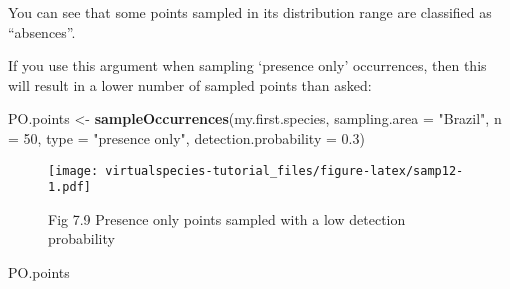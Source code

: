 \documentclass[]{article}
\newenvironment{Shaded}{\begin{snugshade}}{\end{snugshade}}
\newcommand{\KeywordTok}[1]{\textcolor[rgb]{0.13,0.29,0.53}{\textbf{#1}}}
\newcommand{\DataTypeTok}[1]{\textcolor[rgb]{0.13,0.29,0.53}{#1}}
\newcommand{\DecValTok}[1]{\textcolor[rgb]{0.00,0.00,0.81}{#1}}
\newcommand{\FloatTok}[1]{\textcolor[rgb]{0.00,0.00,0.81}{#1}}
\newcommand{\StringTok}[1]{\textcolor[rgb]{0.31,0.60,0.02}{#1}}
\newcommand{\NormalTok}[1]{#1}
\begin{document}
You can see that some points sampled in its distribution range are
classified as ``absences''.

If you use this argument when sampling `presence only' occurrences, then
this will result in a lower number of sampled points than asked:

\begin{Shaded}
\begin{Highlighting}[]
\NormalTok{PO.points <-}\StringTok{ }\KeywordTok{sampleOccurrences}\NormalTok{(my.first.species,}
                               \DataTypeTok{sampling.area =} \StringTok{"Brazil"}\NormalTok{,}
                               \DataTypeTok{n =} \DecValTok{50}\NormalTok{,}
                               \DataTypeTok{type =} \StringTok{"presence only"}\NormalTok{,}
                               \DataTypeTok{detection.probability =} \FloatTok{0.3}\NormalTok{)}
\end{Highlighting}
\end{Shaded}

\begin{figure}
\centering
\texttt{[image: virtualspecies-tutorial\_files/figure-latex/samp12-1.pdf]}
\caption{Fig 7.9 Presence only points sampled with a low detection
probability}
\end{figure}

\begin{Shaded}
\begin{Highlighting}[]
\NormalTok{PO.points}
\end{Highlighting}
\end{Shaded}
\end{document}
